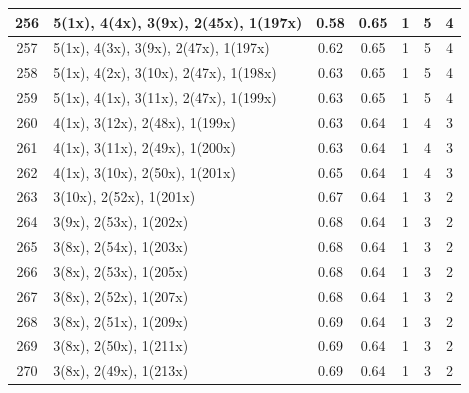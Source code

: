 \begin{small}
\begin{longtable}{|c|p{4cm}|c|c|c|c|c|}
  256 & 5(1x), 4(4x), 3(9x), 2(45x), 1(197x) & \cellcolor{colorOK}  0.58 & \cellcolor{colorOK} 0.65 & 1 & 5 & \cellcolor{colorGood} 4 \\   \hline
  257 & 5(1x), 4(3x), 3(9x), 2(47x), 1(197x) & \cellcolor{colorOK}  0.62 & \cellcolor{colorOK} 0.65 & 1 & 5 & \cellcolor{colorGood} 4 \\   \hline
  258 & 5(1x), 4(2x), 3(10x), 2(47x), 1(198x) & \cellcolor{colorOK}  0.63 & \cellcolor{colorOK} 0.65 & 1 & 5 & \cellcolor{colorGood} 4 \\   \hline
  259 & 5(1x), 4(1x), 3(11x), 2(47x), 1(199x) & \cellcolor{colorOK}  0.63 & \cellcolor{colorOK} 0.65 & 1 & 5 & \cellcolor{colorGood} 4 \\   \hline
  260 & 4(1x), 3(12x), 2(48x), 1(199x) & \cellcolor{colorOK}  0.63 & \cellcolor{colorOK} 0.64 & 1 & 4 & \cellcolor{colorGood} 3 \\   \hline
  261 & 4(1x), 3(11x), 2(49x), 1(200x) & \cellcolor{colorOK}  0.63 & \cellcolor{colorOK} 0.64 & 1 & 4 & \cellcolor{colorGood} 3 \\   \hline
  262 & 4(1x), 3(10x), 2(50x), 1(201x) & \cellcolor{colorBad}  0.65 & \cellcolor{colorBad} 0.64 & 1 & 4 & \cellcolor{colorGood} 3 \\   \hline
  263 & 3(10x), 2(52x), 1(201x) & \cellcolor{colorBad}  0.67 & \cellcolor{colorBad} 0.64 & 1 & 3 & \cellcolor{colorGood} 2 \\   \hline
  264 & 3(9x), 2(53x), 1(202x) & \cellcolor{colorBad}  0.68 & \cellcolor{colorBad} 0.64 & 1 & 3 & \cellcolor{colorGood} 2 \\   \hline
  265 & 3(8x), 2(54x), 1(203x) & \cellcolor{colorBad}  0.68 & \cellcolor{colorBad} 0.64 & 1 & 3 & \cellcolor{colorGood} 2 \\   \hline
  266 & 3(8x), 2(53x), 1(205x) & \cellcolor{colorBad}  0.68 & \cellcolor{colorBad} 0.64 & 1 & 3 & \cellcolor{colorGood} 2 \\   \hline
  267 & 3(8x), 2(52x), 1(207x) & \cellcolor{colorBad}  0.68 & \cellcolor{colorBad} 0.64 & 1 & 3 & \cellcolor{colorGood} 2 \\   \hline
  268 & 3(8x), 2(51x), 1(209x) & \cellcolor{colorBad}  0.69 & \cellcolor{colorBad} 0.64 & 1 & 3 & \cellcolor{colorGood} 2 \\   \hline
  269 & 3(8x), 2(50x), 1(211x) & \cellcolor{colorBad}  0.69 & \cellcolor{colorBad} 0.64 & 1 & 3 & \cellcolor{colorGood} 2 \\   \hline
  270 & 3(8x), 2(49x), 1(213x) & \cellcolor{colorBad}  0.69 & \cellcolor{colorBad} 0.64 & 1 & 3 & \cellcolor{colorGood} 2 \\   \hline

\end{longtable}
\end{small}
